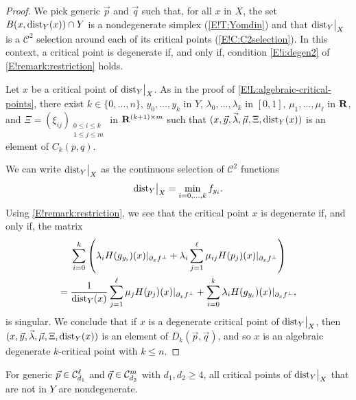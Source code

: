 \begin{proof}
  We pick generic $\vec{p}$ and $\vec{q}$ such that, for all $x$ in $X$, the set $B(x, \operatorname{dist}_Y(x)) \cap Y$ is a nondegenerate simplex (\cref{E!T:Yomdin}) and that $\mathord{\operatorname{dist}}_Y\big|_X$ is a $\mathcal{C}^2$ selection around each of its critical points (\cref{E!C:C2selection}). In this context, a critical point is degenerate if, and only if, condition \ref{E!i:degen2} of \cref{E!remark:restriction} holds.
  
  Let $x$ be a critical point of $\mathord{\operatorname{dist}}_Y\big|_X$. As in the proof of \cref{E!L:algebraic-critical-points}, there exist $k \in \{0, \ldots, n\}$, $y_0, \ldots, y_k$ in $Y$, $\lambda_0, \ldots, \lambda_k$ in $[0, 1]$, $\mu_1, \ldots, \mu_\ell$ in $\mathbf{R}$, and $\Xi = (\xi_{ij})_{\substack{0 \leq i \leq k \\ 1 \leq j \leq m}}$ in $\mathbf{R}^{(k + 1) \times m}$ such that $(x, \vec{y}, \vec{\lambda}, \vec{\mu}, \Xi, \operatorname{dist}_Y(x))$ is an element of $C_k(p, q)$.
  
  We can write $\mathord{\operatorname{dist}}_Y\big|_X$ as the continuous selection of $\mathcal{C}^2$ functions
  \[
    \mathord{\operatorname{dist}}_Y\big|_X = \min_{i = 0, \ldots, k} f_{y_i}.
  \]
  Using \cref{E!remark:restriction}, we see that the critical point $x$ is degenerate if, and only if, the matrix
  \begin{align*}
    & \sum_{i = 0}^k \left( \lambda_i H(g_{y_i})(x)|_{\partial_x f^\bot} + \lambda_i \sum_{j = 1}^\ell \mu_{ij} H(p_j)(x)|_{\partial_x f^\bot} \right) \\
    = {} & \frac{1}{\operatorname{dist}_Y(x)} \sum_{j = 1}^\ell \mu_j H(p_j)(x)|_{\partial_x f^\bot} + \sum_{i = 0}^k \lambda_i H(g_{y_i})(x)|_{\partial_x f^\bot},
  \end{align*}
  is singular. We conclude that if $x$ is a degenerate critical point of $\mathord{\operatorname{dist}}_Y\big|_X$, then $(x, \vec{y}, \vec{\lambda}, \vec{\mu}, \Xi, \operatorname{dist}_Y(x))$ is an element of $D_k(\vec{p}, \vec{q})$, and so $x$ is an algebraic degenerate $k$-critical point with $k \leq n$.
\end{proof}

\begin{theorem}
\label{E!T:genericity-nondegeneracy}
  For generic $\vec{p} \in \mathcal{C}_{d_1}^\ell$ and $\vec{q} \in \mathcal{C}_{d_2}^m$ with $d_1, d_2 \geq 4$, all critical points of $\mathord{\operatorname{dist}}_Y\big|_X$ that are not in $Y$ are nondegenerate.
\end{theorem}

